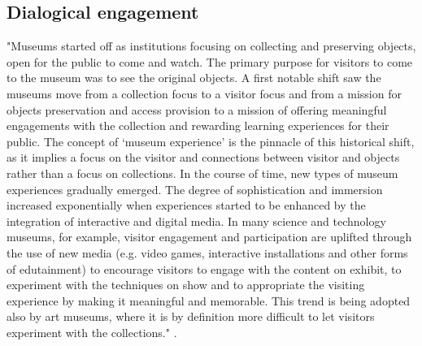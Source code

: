 \subsection{Dialogical engagement}

"Museums started off as institutions focusing on collecting and preserving objects, open for the public to come and watch. The primary purpose for visitors to come to the museum was to see the original objects. A first notable shift saw the museums move from a collection focus to a visitor focus and from a mission for objects preservation and access provision to a mission of offering meaningful engagements with the collection and rewarding learning experiences for their public. The concept of ‘museum experience’ is the pinnacle of this historical shift, as it implies a focus on the visitor and connections between visitor and objects rather than a focus on collections. In the course of time, new types of museum experiences gradually emerged. The degree of sophistication and immersion increased exponentially when experiences started to be enhanced by the integration of interactive and digital media. In many science and technology museums, for example, visitor engagement and participation are uplifted through the use of new media (e.g. video games, interactive installations and other forms of edutainment) to encourage visitors to engage with the content on exhibit, to experiment with the techniques on show and to appropriate the visiting experience by making it meaningful and memorable. This trend is being adopted also by art museums, where it is by definition more difficult to let visitors experiment with the collections." \autocite[p. 3]{vermeeren_museum_2018}.


